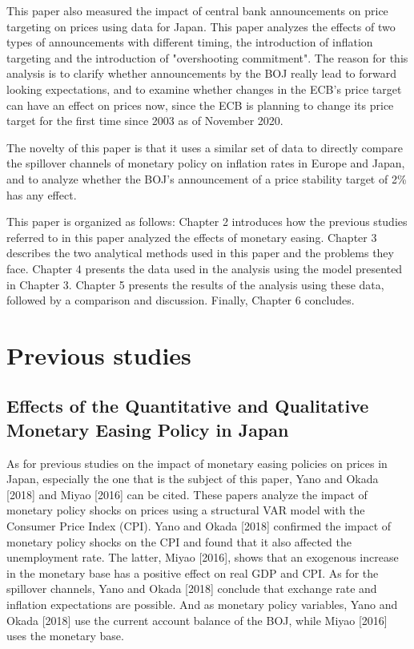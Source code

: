 \documentclass[12pt]{article}
\begin{document}
This paper also measured the impact of central bank announcements on price targeting on prices using data for Japan. This paper analyzes the effects of two types of announcements with different timing, the introduction of inflation targeting and the introduction of "overshooting commitment".
The reason for this analysis is to clarify whether announcements by the BOJ really lead to forward looking expectations, and to examine whether changes in the ECB's price target can have an effect on prices now, since the ECB is planning to change its price target for the first time since 2003 as of November 2020.

The novelty of this paper is that it uses a similar set of data to directly compare the spillover channels of monetary policy on inflation rates in Europe and Japan, and to analyze whether the BOJ's announcement of a price stability target of 2\% has any effect.

This paper is organized as follows: Chapter 2 introduces how the previous studies referred to in this paper analyzed the effects of monetary easing.
Chapter 3 describes the two analytical methods used in this paper and the problems they face. Chapter 4 presents the data used in the analysis using the model presented in Chapter 3. Chapter 5 presents the results of the analysis using these data, followed by a comparison and discussion. Finally, Chapter 6 concludes.

\newpage

\section{Previous studies}

\subsection{Effects of the Quantitative and Qualitative Monetary Easing Policy in Japan}

As for previous studies on the impact of monetary easing policies on prices in Japan, especially the one that is the subject of this paper, Yano and Okada [2018] and Miyao [2016] can be cited.
These papers analyze the impact of monetary policy shocks on prices using a structural VAR model with the Consumer Price Index (CPI).
Yano and Okada [2018] confirmed the impact of monetary policy shocks on the CPI and found that it also affected the unemployment rate. The latter, Miyao [2016], shows that an exogenous increase in the monetary base has a positive effect on real GDP and CPI.
As for the spillover channels, Yano and Okada [2018] conclude that exchange rate and inflation expectations are possible.
And as monetary policy variables, Yano and Okada [2018] use the current account balance of the BOJ, while Miyao [2016] uses the monetary base.
\end{document}
